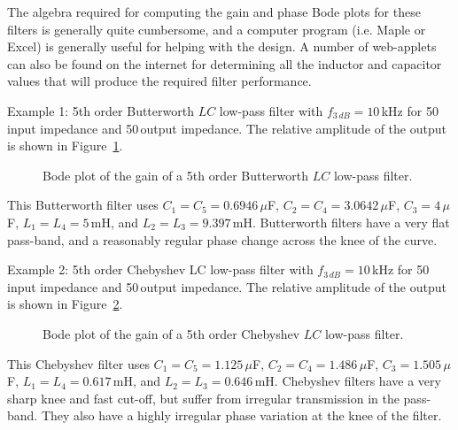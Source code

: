 \documentclass{article}
\begin{document}
The algebra required for computing the gain and phase Bode plots for these filters is generally quite cumbersome, and a computer program (i.e. Maple or Excel) is generally useful for helping with the design. A number of web-applets can also be found on the internet for determining all the inductor and capacitor values that will produce the required filter performance.

Example 1: 5th order Butterworth $LC$ low-pass filter with $f_{3\,dB} = 10$\,kHz for 50\,\Ohm input impedance and 50\,\Ohm output impedance. The relative amplitude of the output is shown in Figure~\ref{fig:lc_low_pass_butterworth_filter_5th_order}.

\begin{figure}
\begin{center}
\end{center}
\caption{Bode plot of the gain of a 5th order Butterworth $LC$ low-pass filter.}
\label{fig:lc_low_pass_butterworth_filter_5th_order}
\end{figure}

This Butterworth filter uses $C_1 = C_5 = 0.6946\,\mu$F, $C_2 = C_4 = 3.0642\,\mu$F, $C_3 = 4\,\mu$F, $L_1 = L_4 = 5$\,mH, and $L_2 = L_3 = 9.397$\,mH. Butterworth filters have a very flat pass-band, and a reasonably regular phase change across the knee of the curve.

Example 2: 5th order Chebyshev LC low-pass filter with $f_{3\,dB} = 10$\,kHz for 50\,\Ohm input impedance and 50\,\Ohm output impedance. The relative amplitude of the output is shown in Figure~\ref{fig:lc_low_pass_chebyshev_filter_5th_order}.


\begin{figure}
\begin{center}
\end{center}
\caption{Bode plot of the gain of a 5th order Chebyshev $LC$ low-pass filter.}
\label{fig:lc_low_pass_chebyshev_filter_5th_order}
\end{figure}

This Chebyshev filter uses $C_1 = C_5 = 1.125\,\mu$F, $C_2 = C_4 = 1.486\,\mu$F, $C_3 = 1.505\,\mu$F, $L_1 = L_4 = 0.617$\,mH, and $L_2 = L_3 = 0.646$\,mH. Chebyshev filters have a very sharp knee and fast cut-off, but suffer from irregular transmission in the pass-band. They also have a highly irregular phase variation at the knee of the filter.
\end{document}
